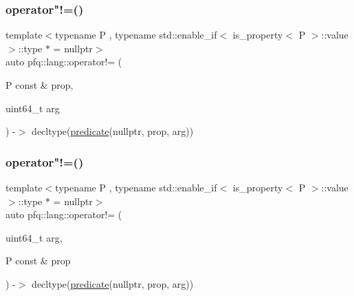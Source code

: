 \mbox{\label{namespacepfq_1_1lang_a4943eabefcfed4198394f42f913a14e8}} 
\subsubsection{\texorpdfstring{operator"!=()}{operator!=()}\hspace{0.1cm}{\footnotesize\ttfamily [1/2]}}
{\footnotesize\ttfamily template$<$typename P , typename std\+::enable\+\_\+if$<$ is\+\_\+property$<$ P $>$\+::value $>$\+::type $\ast$  = nullptr$>$ \\
auto pfq\+::lang\+::operator!= (\begin{DoxyParamCaption}\item[{P const \&}]{prop,  }\item[{uint64\+\_\+t}]{arg }\end{DoxyParamCaption}) -\/$>$ decltype(\hyperlink{namespacepfq_1_1lang_aca9adafc436b7f851621b979fa1aaf88}{predicate}(nullptr, prop, arg))
    \hspace{0.3cm}{\ttfamily [inline]}}

\mbox{\label{namespacepfq_1_1lang_a55e12516137152fe0525bfc203b5fe50}} 
\subsubsection{\texorpdfstring{operator"!=()}{operator!=()}\hspace{0.1cm}{\footnotesize\ttfamily [2/2]}}
{\footnotesize\ttfamily template$<$typename P , typename std\+::enable\+\_\+if$<$ is\+\_\+property$<$ P $>$\+::value $>$\+::type $\ast$  = nullptr$>$ \\
auto pfq\+::lang\+::operator!= (\begin{DoxyParamCaption}\item[{uint64\+\_\+t}]{arg,  }\item[{P const \&}]{prop }\end{DoxyParamCaption}) -\/$>$ decltype(\hyperlink{namespacepfq_1_1lang_aca9adafc436b7f851621b979fa1aaf88}{predicate}(nullptr, prop, arg))
    \hspace{0.3cm}{\ttfamily [inline]}}

\mbox{\label{namespacepfq_1_1lang_aa358821bfd1326e552c69635b969835d}} 
